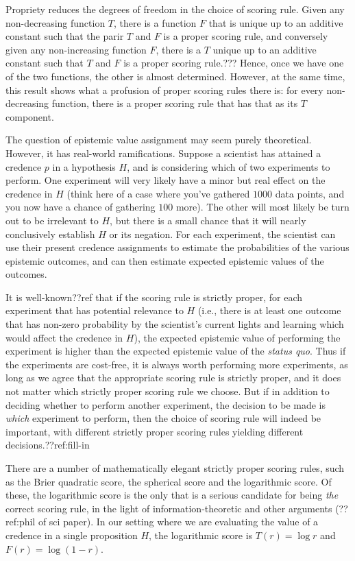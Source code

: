 Propriety reduces the degrees of freedom in the choice of scoring rule. Given any non-decreasing function $T$, there is a
function $F$ that is unique up to an additive constant such that the parir $T$ and $F$ is a proper scoring rule, and conversely given
any non-increasing function $F$, there is a $T$ unique up to an additive constant such that $T$ and $F$ is a proper scoring rule.???
Hence, once we have one of the two functions, the other is almost determined. However, at the same time, this result shows what
a profusion of proper scoring rules there is: for every non-decreasing function, there is a proper scoring rule that has that as 
its $T$ component.

The question of epistemic value assignment may seem purely theoretical. However, it has real-world ramifications. 
Suppose a scientist has attained a credence $p$ in a hypothesis $H$, and is considering which of two experiments to
perform. One experiment will very likely have a minor but real effect on the credence in $H$ (think here of a case
where you've gathered $1000$ data points, and you now have a chance of gathering $100$ more). The other will most
likely be turn out to be irrelevant to $H$, but there is a small chance that it will nearly conclusively establish
$H$ or its negation. For each experiment, the scientist can use their present credence assignments to estimate the
probabilities of the various epistemic outcomes, and can then estimate expected epistemic values of the outcomes.

It is well-known??ref that if the scoring rule is strictly proper, for each experiment that has potential relevance 
to $H$ (i.e., there is at least one outcome that has non-zero probability by the scientist's current lights and
learning which would affect the credence in $H$), the expected epistemic value of performing the experiment is
higher than the expected epistemic value of the \textit{status quo}. Thus if the experiments are cost-free, it is
always worth performing more experiments, as long as we agree that the appropriate scoring rule is strictly proper,
and it does not matter which strictly proper scoring rule we choose. But if in addition to deciding whether to perform
another experiment, the decision to be made is \textit{which} experiment to perform, then the choice of scoring rule
will indeed be important, with different strictly proper scoring rules yielding different decisions.??ref:fill-in

There are a number of mathematically elegant strictly proper scoring rules, such as the Brier quadratic score, the spherical score 
and the logarithmic score. Of these, the logarithmic score is the only that is a serious candidate for being \textit{the} correct
scoring rule, in the light of information-theoretic and other arguments (??ref:phil of sci paper). In our setting where we are
evaluating the value of a credence in a single proposition $H$, the logarithmic score is $T(r) = \log r$ and $F(r) = \log (1-r)$. 

